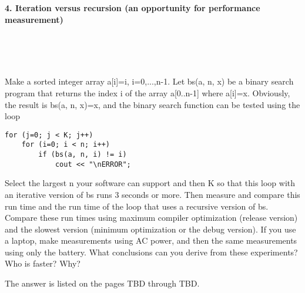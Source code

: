 \documentclass{article}
\begin{document}
\paragraph{}\	
\paragraph{}\
\paragraph{}\
\paragraph{}\

	\rmfamily
	
	\paragraph{4. Iteration versus recursion (an opportunity for performance measurement) }\
	
	\rmfamily\
	
		Make a sorted integer array a[i]=i, i=0,...,n-1.  Let bs(a, n, x) be a binary search program that returns the index i of the array a[0..n-1] where a[i]=x. Obviously, the result is bs(a, n, x)=x, and the binary search function can be tested using the loop
		
		\begin{verbatim}
for (j=0; j < K; j++)
    for (i=0; i < n; i++)
        if (bs(a, n, i) != i)
            cout << "\nERROR";
		\end{verbatim}
		
		
		Select the largest n your software can support and then K so that this loop with an iterative version of bs runs 3 seconds or more. Then measure and compare this run time and the run time of the loop that uses a recursive version of bs. Compare these run times using maximum compiler optimization (release version) and the slowest version (minimum optimization or the debug version). If you use a laptop, make measurements using AC power, and then the same measurements using only the battery. What conclusions can you derive from these experiments? Who is faster? Why?
		\newline
		
		The answer is listed on the pages TBD through TBD.
	

\paragraph{}\
\end{document}
